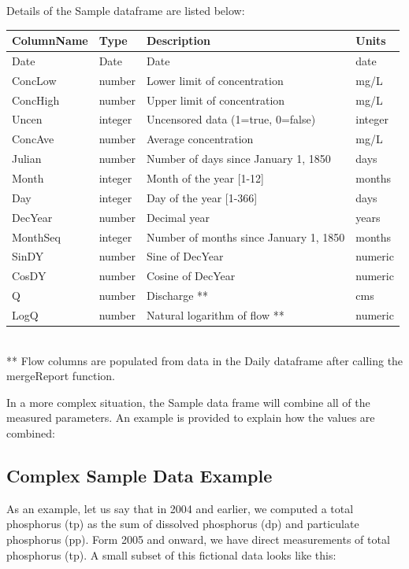 \documentclass[a4paper,11pt]{article}
\begin{document}
Details of the Sample dataframe are listed below:

\begin{tabular}{llll}
  \hline
ColumnName & Type & Description & Units \\ 
  \hline
Date & Date & Date & date \\ 
  ConcLow & number & Lower limit of concentration & mg/L \\ 
  ConcHigh & number & Upper limit of concentration & mg/L \\ 
  Uncen & integer & Uncensored data (1=true, 0=false) & integer \\ 
  ConcAve & number & Average concentration & mg/L \\ 
  Julian & number & Number of days since January 1, 1850 & days \\ 
  Month & integer & Month of the year [1-12] & months \\ 
  Day & integer & Day of the year [1-366] & days \\ 
  DecYear & number & Decimal year & years \\ 
  MonthSeq & integer & Number of months since January 1, 1850 & months \\ 
  SinDY & number & Sine of DecYear & numeric \\ 
  CosDY & number & Cosine of DecYear & numeric \\ 
  Q & number & Discharge ** & cms \\ 
  LogQ & number & Natural logarithm of flow ** & numeric \\ 
   \hline
\end{tabular}\\
** Flow columns are populated from data in the Daily dataframe after calling the mergeReport function.


In a more complex situation, the Sample data frame will combine all of the measured parameters.  An example is provided to explain how the values are combined:

\subsection{Complex Sample Data Example}
As an example, let us say that in 2004 and earlier, we computed a total phosphorus (tp) as the sum of dissolved phosphorus (dp) and particulate phosphorus (pp). Form 2005 and onward, we have direct measurements of total phosphorus (tp). A small subset of this fictional data looks like this:
\end{document}
